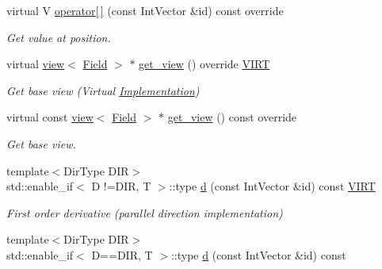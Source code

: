 \begin{DoxyCompactItemize}
virtual V \hyperlink{classUintah_1_1PhaseField_1_1detail_1_1bc__fd_3_01ScalarField_3_01T_01_4_00_01STN_00_01NC_00_01Fc8a6e28ffa258d282d0a921216b0ed9f_ade8541fd8e1d3c81ca6ae8a84af357ec}{operator\mbox{[}$\,$\mbox{]}} (const Int\+Vector \&id) const override
\begin{DoxyCompactList}\small\item\em Get value at position. \end{DoxyCompactList}\item 
virtual \hyperlink{classUintah_1_1PhaseField_1_1detail_1_1view}{view}$<$ \hyperlink{structUintah_1_1PhaseField_1_1ScalarField}{Field} $>$ $\ast$ \hyperlink{classUintah_1_1PhaseField_1_1detail_1_1bc__fd_3_01ScalarField_3_01T_01_4_00_01STN_00_01NC_00_01Fc8a6e28ffa258d282d0a921216b0ed9f_a27bd79a8b66a0a7a21a2473795f11911}{get\+\_\+view} () override \hyperlink{Definitions_8h_a3ce9c14452594b5b9ee3b63f9b3a981e}{V\+I\+RT}
\begin{DoxyCompactList}\small\item\em Get base view (Virtual \hyperlink{classUintah_1_1PhaseField_1_1Implementation}{Implementation}) \end{DoxyCompactList}\item 
virtual const \hyperlink{classUintah_1_1PhaseField_1_1detail_1_1view}{view}$<$ \hyperlink{structUintah_1_1PhaseField_1_1ScalarField}{Field} $>$ $\ast$ \hyperlink{classUintah_1_1PhaseField_1_1detail_1_1bc__fd_3_01ScalarField_3_01T_01_4_00_01STN_00_01NC_00_01Fc8a6e28ffa258d282d0a921216b0ed9f_a01b987b37d15d552579788a353ecce2d}{get\+\_\+view} () const override
\begin{DoxyCompactList}\small\item\em Get base view. \end{DoxyCompactList}\item 
{\footnotesize template$<$Dir\+Type D\+IR$>$ }\\std\+::enable\+\_\+if$<$ D !=D\+IR, T $>$\+::type \hyperlink{classUintah_1_1PhaseField_1_1detail_1_1bc__fd_3_01ScalarField_3_01T_01_4_00_01STN_00_01NC_00_01Fc8a6e28ffa258d282d0a921216b0ed9f_a143a2a7c842f5341b0a9ec43f3fcffc5}{d} (const Int\+Vector \&id) const \hyperlink{Definitions_8h_a3ce9c14452594b5b9ee3b63f9b3a981e}{V\+I\+RT}
\begin{DoxyCompactList}\small\item\em First order derivative (parallel direction implementation) \end{DoxyCompactList}\item 
{\footnotesize template$<$Dir\+Type D\+IR$>$ }\\std\+::enable\+\_\+if$<$ D==D\+IR, T $>$\+::type \hyperlink{classUintah_1_1PhaseField_1_1detail_1_1bc__fd_3_01ScalarField_3_01T_01_4_00_01STN_00_01NC_00_01Fc8a6e28ffa258d282d0a921216b0ed9f_ac757e8ea341c82d1e307bc243d7344a2}{d} (const Int\+Vector \&id) const

\end{DoxyCompactItemize}
